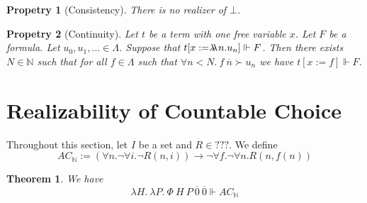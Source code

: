 \documentclass{article}
\newcommand{\N}{\mathbb{N}}
\newcommand{\realizes}{\Vdash}
\newcommand{\oracle}[2]{\lambda\mkern-15mu\lambda\ #1. #2}
\newtheorem{theorem}{Theorem}
\newtheorem{property}{Propetry}
\begin{document}
\begin{property}[Consistency]
    There is no realizer of $\bot$.
\end{property}

\begin{property}[Continuity]
    Let $t$ be a term with one free variable $x$.
    Let $F$ be a formula.
    Let $u_0, u_1, \dots \in \Lambda$.
    Suppose that $t[x := \oracle{n}{u_n}] \realizes F$.
    Then there exists $N \in \N$ such that for all $f \in \Lambda$ such that $\forall n < N.\ f\ \overline{n} \succ u_n$ we have $t[x := f] \realizes F$.
\end{property}


\section{Realizability of Countable Choice}

Throughout this section, let $I$ be a set and $R \in ???$.
We define
\[AC_\N := (\forall n. \neg \forall i. \neg R(n, i)) \rightarrow \neg \forall f. \neg \forall n. R(n, f(n))\]

\begin{theorem} We have
    \[ \lambda H.\ \lambda P.\ \Phi\ H\ P\ \overline{0}\ \overline{0} \realizes AC_\N \]
\end{theorem}
\end{document}
